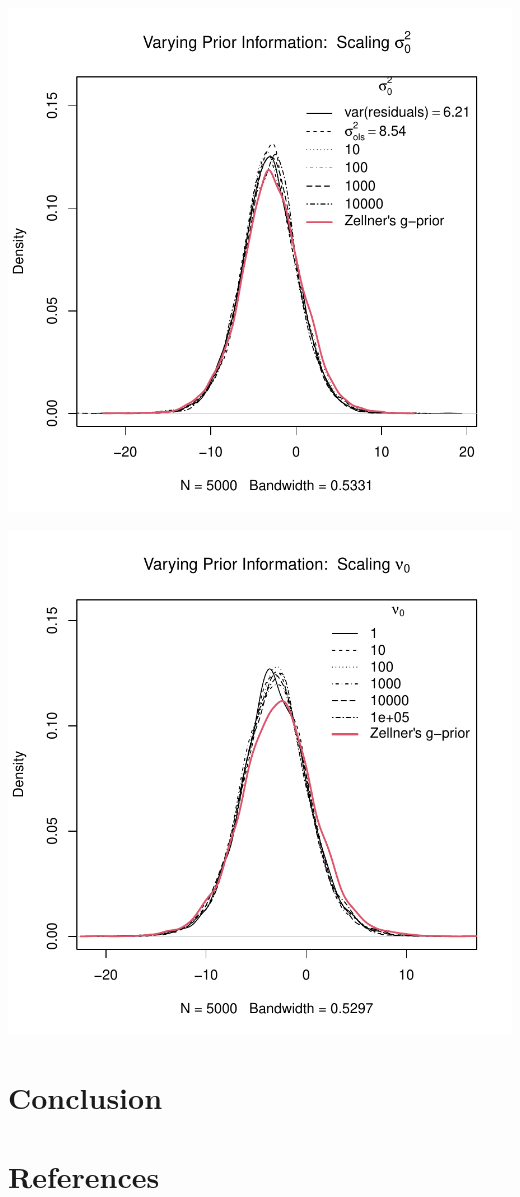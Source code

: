 \documentclass[12pt, a4paper]{article}
\begin{document}
\includegraphics{Thesis-025}

\includegraphics{Thesis-026}

\clearpage

\section{Conclusion}

\section{References}
\end{document}
